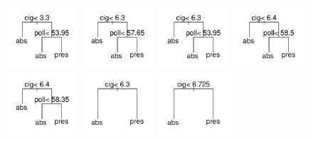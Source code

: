 \documentclass[12pt, a4paper,  BCOR=8.25mm, DIV=15]{scrartcl}\usepackage[]{graphicx}\usepackage[]{color}
\newenvironment{knitrout}{}{} %
\begin{document}
\begin{figure}
\begin{knitrout}
\color{fgcolor}

{\centering \includegraphics[width=0.24\textwidth]{figs/xmeth-rf-x-bronchit-1} 
\includegraphics[width=0.24\textwidth]{figs/xmeth-rf-x-bronchit-2} 
\includegraphics[width=0.24\textwidth]{figs/xmeth-rf-x-bronchit-3} 
\includegraphics[width=0.24\textwidth]{figs/xmeth-rf-x-bronchit-4} 
\includegraphics[width=0.24\textwidth]{figs/xmeth-rf-x-bronchit-5} 
\includegraphics[width=0.24\textwidth]{figs/xmeth-rf-x-bronchit-6} 
\includegraphics[width=0.24\textwidth]{figs/xmeth-rf-x-bronchit-7} 
}
\end{knitrout}
\end{figure}
\end{document}
